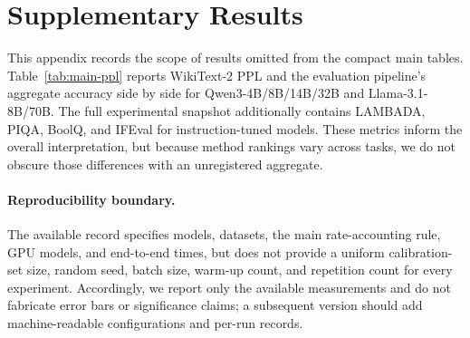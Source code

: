 \section{Supplementary Results}
\label{app:all-results}

This appendix records the scope of results omitted from the compact main tables. Table~\ref{tab:main-ppl} reports WikiText-2 PPL and the evaluation pipeline's aggregate accuracy side by side for Qwen3-4B/8B/14B/32B and Llama-3.1-8B/70B.
The full experimental snapshot additionally contains LAMBADA, PIQA, BoolQ, and IFEval for instruction-tuned models. These metrics inform the overall interpretation, but because method rankings vary across tasks, we do not obscure those differences with an unregistered aggregate.

\paragraph{Reproducibility boundary.} The available record specifies models, datasets, the main rate-accounting rule, GPU models, and end-to-end times, but does not provide a uniform calibration-set size, random seed, batch size, warm-up count, and repetition count for every experiment.
Accordingly, we report only the available measurements and do not fabricate error bars or significance claims; a subsequent version should add machine-readable configurations and per-run records.
